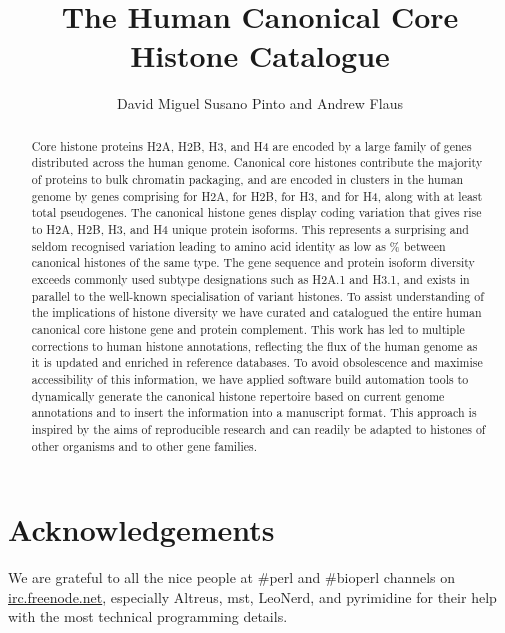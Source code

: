 \documentclass[10pt,a4paper,onecolumn,article,draft]{memoir}
\author{David Miguel Susano Pinto and Andrew Flaus}
\title{The Human Canonical Core Histone Catalogue}
\begin{document}
  \maketitle

  \begin{abstract}
    Core histone proteins H2A, H2B, H3, and H4 are encoded
    by a large family of genes distributed across the human genome.
    Canonical core histones contribute the majority of proteins to bulk
    chromatin packaging,
    and are encoded in \NumberOfClusters{} clusters in the human genome
    by \TotalCoreCodingGenes{} genes comprising
    \HTwoACodingGenes{} for H2A,
    \HTwoBCodingGenes{} for H2B,
    \HThreeCodingGenes{} for H3,
    and \HFourCodingGenes{} for H4,
    along with at least \TotalCorePseudoGenes{} total pseudogenes.
    The canonical histone genes display coding variation that gives rise to
    \HTwoAUniqueProteins{} H2A, \HTwoBUniqueProteins{} H2B,
    \HThreeUniqueProteins{} H3, and \HFourUniqueProteins{} H4 unique protein isoforms.
    This represents a surprising and seldom recognised variation
    leading to amino acid identity as low as
     \result{}\%
    between canonical histones of the same type.
    The gene sequence and protein isoform diversity
    exceeds commonly used subtype designations such as H2A.1 and H3.1,
    and exists in parallel to the well-known specialisation of variant histones.
    To assist understanding of the implications of histone diversity
    we have curated and catalogued the entire human canonical core
    histone gene and protein complement.
    This work has led to multiple corrections to human histone annotations,
    reflecting the flux of the human genome as it is updated and
    enriched in reference databases.
    To avoid obsolescence and maximise accessibility of this information,
    we have applied software build automation tools to
    dynamically generate the canonical histone repertoire
    based on current genome annotations and to insert the information
    into a manuscript format.
    This approach is inspired by the aims of reproducible research
    and can readily be adapted to histones of other organisms and
    to other gene families.
  \end{abstract}

  
  
  
  
  
  
  

  \section{Acknowledgements}
    We are grateful to all the nice people at \#perl and \#bioperl channels on
    \url{irc.freenode.net}, especially Altreus, mst, LeoNerd, and pyrimidine for
    their help with the most technical programming details.

  

  \newpage
  \appendix
  
\end{document}
